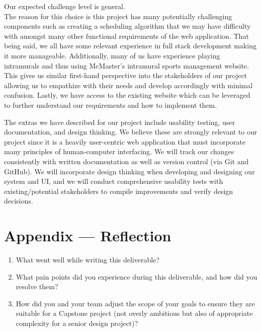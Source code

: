\documentclass{article}
\begin{document}
Our expected challenge level is general.\\
The reason for this choice is this project has many potentially challenging components such as creating a scheduling algorithm that we may have difficulty with amongst many other functional requirements of the web application. That being said, we all have some relevant experience in full stack development making it more manageable. Additionally, many of us have experience playing intramurals and thus using McMaster's intramural sports management website. This gives us similar first-hand perspective into the stakeholders of our project allowing us to empathize with their needs and develop accordingly with minimal confusion. Lastly, we have access to the existing website which can be leveraged to further understand our requirements and how to implement them.

The extras we have described for our project include usability testing, user documentation, and design thinking.
We believe these are strongly relevant to our project since it is a heavily user-centric web application that must incorporate many principles of human-computer interfacing. We will track our changes consistently with written documentation as well as version control (via Git and GitHub). We will incorporate design thinking when developing and designing our system and UI, and we will conduct comprehensive usability tests with existing/potential stakeholders to compile improvements and verify design decisions.

\newpage{}

\section*{Appendix --- Reflection}




\begin{enumerate}
    \item What went well while writing this deliverable? 
    \item What pain points did you experience during this deliverable, and how
    did you resolve them?
    \item How did you and your team adjust the scope of your goals to ensure
    they are suitable for a Capstone project (not overly ambitious but also of
    appropriate complexity for a senior design project)?
\end{enumerate}  
\end{document}
